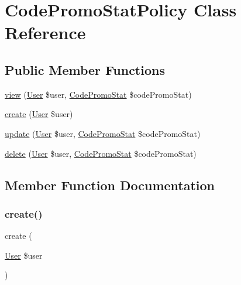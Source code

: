 \hypertarget{class_app_1_1_policies_1_1_code_promo_stat_policy}{}\section{Code\+Promo\+Stat\+Policy Class Reference}
\label{class_app_1_1_policies_1_1_code_promo_stat_policy}
\subsection*{Public Member Functions}
\begin{DoxyCompactItemize}
\item 
\mbox{\hyperlink{class_app_1_1_policies_1_1_code_promo_stat_policy_aa86c1636af6c2a4e6fddcd59538934a4}{view}} (\mbox{\hyperlink{class_app_1_1_user}{User}} \$user, \mbox{\hyperlink{class_app_1_1_code_promo_stat}{Code\+Promo\+Stat}} \$code\+Promo\+Stat)
\item 
\mbox{\hyperlink{class_app_1_1_policies_1_1_code_promo_stat_policy_a7626db07d2ee9a50d2839c019dbf037d}{create}} (\mbox{\hyperlink{class_app_1_1_user}{User}} \$user)
\item 
\mbox{\hyperlink{class_app_1_1_policies_1_1_code_promo_stat_policy_ab256da128beb56251239d39d7f61b17d}{update}} (\mbox{\hyperlink{class_app_1_1_user}{User}} \$user, \mbox{\hyperlink{class_app_1_1_code_promo_stat}{Code\+Promo\+Stat}} \$code\+Promo\+Stat)
\item 
\mbox{\hyperlink{class_app_1_1_policies_1_1_code_promo_stat_policy_a975f0fa0997dd8de3e8297aa30ebe323}{delete}} (\mbox{\hyperlink{class_app_1_1_user}{User}} \$user, \mbox{\hyperlink{class_app_1_1_code_promo_stat}{Code\+Promo\+Stat}} \$code\+Promo\+Stat)
\end{DoxyCompactItemize}


\subsection{Member Function Documentation}
\mbox{\label{class_app_1_1_policies_1_1_code_promo_stat_policy_a7626db07d2ee9a50d2839c019dbf037d}} 
\subsubsection{\texorpdfstring{create()}{create()}}
{\footnotesize\ttfamily create (\begin{DoxyParamCaption}\item[{\mbox{\hyperlink{class_app_1_1_user}{User}}}]{\$user }\end{DoxyParamCaption})}

